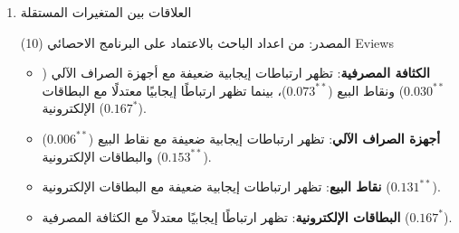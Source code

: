 \documentclass[10pt,a4paper]{report}
\begin{document}
\begin{doublespacing}
\begin{enumerate}
\begin{itemize}
	\item \textbf{سعر الصرف}: 
	الكثافة المصرفية تظهر ارتباطًا إيجابيًا ($0.347^*$) مع سعر الصرف، مما يشير إلى أن زيادة الكثافة المصرفية قد تؤدي إلى ارتفاع سعر الصرف.
\end{itemize}
\item العلاقات بين المتغيرات المستقلة
\begin{table}[H]
	\captionsetup{font=Large}  %
	\fontsize{14}{12}\selectfont
	\centering
	\caption{مصفوفة الارتباطات بين المتغيرات المستقلة}
	\label{tab:14.3}
	\end{table}
المصدر: من اعداد الباحث بالاعتماد على البرنامج الاحصائي (10) Eviews
\begin{itemize}
	\item \textbf{الكثافة المصرفية}: 
	تظهر ارتباطات إيجابية ضعيفة مع أجهزة الصراف الآلي ($0.030^{**}$) ونقاط البيع ($0.073^{**}$)، بينما تظهر ارتباطًا إيجابيًا معتدلًا مع البطاقات الإلكترونية ($0.167^{*}$).
	
	\item \textbf{أجهزة الصراف الآلي}: 
	تظهر ارتباطات إيجابية ضعيفة مع نقاط البيع ($0.006^{**}$) والبطاقات الإلكترونية ($0.153^{**}$).
	
	\item \textbf{نقاط البيع}: 
	تظهر ارتباطات إيجابية ضعيفة مع البطاقات الإلكترونية ($0.131^{**}$).
	
	\item \textbf{البطاقات الإلكترونية}: 
	تظهر ارتباطًا إيجابيًا معتدلاً مع الكثافة المصرفية ($0.167^{*}$).
\end{itemize}
\end{enumerate}


\end{doublespacing}
\end{document}
